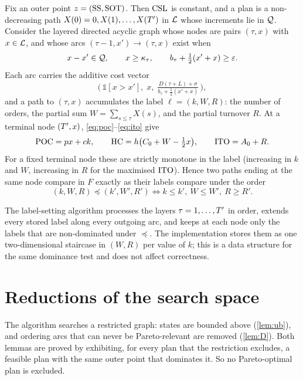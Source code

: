 Fix an outer point $z=(\mathrm{SS},\mathrm{SOT})$. Then $\mathrm{CSL}$ is constant, and a plan is a
non-decreasing path $X(0)=0,X(1),\dots,X(T')$ in $\mathcal{L}$ whose increments lie in $\mathcal{Q}$.
Consider the layered directed acyclic graph whose nodes are pairs $(\tau,x)$ with
$x\in\mathcal{L}$, and whose arcs $(\tau-1,x')\to(\tau,x)$ exist when
\begin{equation}\label{eq:arc}
  x-x'\in\mathcal{Q},\qquad x\ge\kappa_\tau,\qquad b_\tau+\tfrac12(x'+x)\ge\varepsilon .
\end{equation}
Each arc carries the additive cost vector
\begin{equation}\label{eq:arccost}
  \bigl(\,\mathbb{1}[x>x'],\; x,\; \tfrac{D(\tau+L)+\sigma}{b_\tau+\frac12(x'+x)}\,\bigr),
\end{equation}
and a path to $(\tau,x)$ accumulates the label $\ell=(k,W,R)$: the number of orders, the
partial sum $W=\sum_{s\le\tau}X(s)$, and the partial turnover $R$. At a terminal node
$(T',x)$, \eqref{eq:poc}--\eqref{eq:ito} give
\begin{equation}\label{eq:terminal}
  \mathrm{POC}=p x+c k,\qquad \mathrm{HC}=h\bigl(C_0+W-\tfrac12x\bigr),\qquad \mathrm{ITO}=A_0+R .
\end{equation}
For a fixed terminal node these are strictly monotone in the label (increasing in $k$
and $W$, increasing in $R$ for the maximised $\mathrm{ITO}$). Hence two paths ending at the same
node compare in $F$ exactly as their labels compare under the order
\begin{equation}
  (k,W,R)\preceq(k',W',R')\iff k\le k',\ W\le W',\ R\ge R'.
\end{equation}

The label-setting algorithm processes the layers $\tau=1,\dots,T'$ in order, extends
every stored label along every outgoing arc, and keeps at each node only the labels that
are non-dominated under $\preceq$. The implementation stores them as one
two-dimensional staircase in $(W,R)$ per value of $k$; this is a data structure for the
same dominance test and does not affect correctness.

\section{Reductions of the search space}\label{sec:reductions}

The algorithm searches a restricted graph: states are bounded above (\cref{lem:ub}), and
ordering arcs that can never be Pareto-relevant are removed (\cref{lem:D}). Both lemmas
are proved by exhibiting, for every plan that the restriction excludes, a feasible plan
with the same outer point that dominates it. So no Pareto-optimal plan is excluded.

